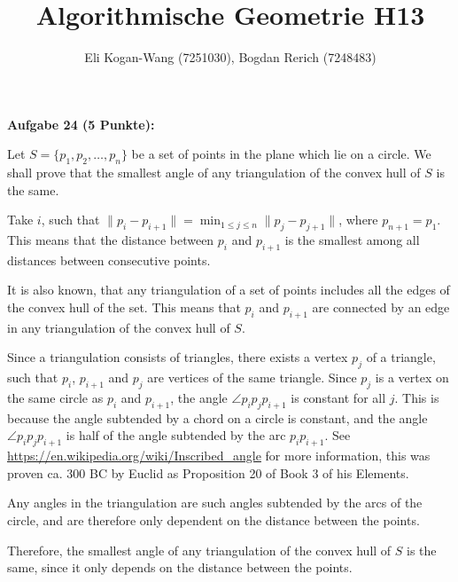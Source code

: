 \documentclass{article}
\title{Algorithmische Geometrie H13}
\author{Eli Kogan-Wang (7251030), Bogdan Rerich (7248483)}
\begin{document}
%
\maketitle


\textbf{Aufgabe 24 (5 Punkte):}

Let $S=\{p_1, p_2, \ldots, p_n\}$ be a set of points in the plane which lie on a circle.
We shall prove that the smallest angle of any triangulation of the convex hull of $S$ is the same.

Take $i$, such that $\|p_i - p_{i+1}\| = \min_{1 \leq j \leq n} \|p_j - p_{j+1}\|$, where $p_{n+1} = p_1$.
This means that the distance between $p_i$ and $p_{i+1}$ is the smallest among all distances between consecutive points.

It is also known, that any triangulation of a set of points includes all the edges of the convex hull of the set.
This means that $p_i$ and $p_{i+1}$ are connected by an edge in any triangulation of the convex hull of $S$.

Since a triangulation consists of triangles, there exists a vertex $p_j$ of a triangle, such that $p_i$, $p_{i+1}$ and $p_j$ are vertices of the same triangle.
Since $p_j$ is a vertex on the same circle as $p_i$ and $p_{i+1}$, the angle $\angle p_i p_j p_{i+1}$ is constant for all $j$.
This is because the angle subtended by a chord on a circle is constant, and the angle $\angle p_i p_j p_{i+1}$ is half of the angle subtended by the arc $p_i p_{i+1}$.
See \url{https://en.wikipedia.org/wiki/Inscribed_angle} for more information, this was proven ca. 300 BC by Euclid as Proposition 20 of Book 3 of his Elements.

Any angles in the triangulation are such angles subtended by the arcs of the circle, and are therefore only dependent on the distance between the points.

Therefore, the smallest angle of any triangulation of the convex hull of $S$ is the same, since it only depends on the distance between the points.
\end{document}
